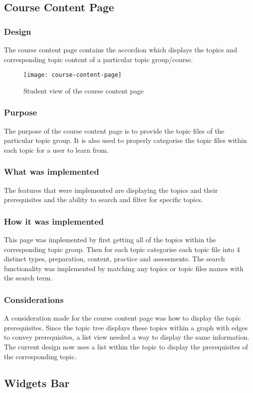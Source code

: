 \subsection{Course Content Page}
\subsubsection{Design}
The course content page contains the accordion which displays the topics and corresponding topic content of a particular topic group/course.
\begin{figure}[h!]
    \centering
    \texttt{[image: course-content-page]}
    \caption{Student view of the course content page}
\end{figure}
\subsubsection{Purpose}
The purpose of the course content page is to provide the topic files of the particular topic group. It is also used to properly categorise the topic files within each topic for a user to learn from.
\subsubsection{What was implemented}
The features that were implemented are displaying the topics and their prerequisites and the ability to search and filter for specific topics.
\subsubsection{How it was implemented}
This page was implemented by first getting all of the topics within the corresponding topic group. Then for each topic categorise each topic file into 4 distinct types, preparation, content, practice and assessments.
The search functionality was implemented by matching any topics or topic files names with the search term.
\subsubsection{Considerations}
A consideration made for the course content page was how to display the topic prerequisites. Since the topic tree displays these topics within a graph with edges to convey prerequisites, a list view needed a way to display the same information.
The current design now uses a list within the topic to display the prerequisites of the corresponding topic.

\subsection{Widgets Bar}
